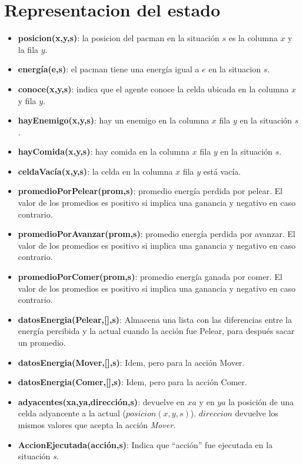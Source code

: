 \section{Representacion del estado}

\begin{itemize}

\item \textbf{posicion(x,y,s)}: la posicion del pacman en la situación $s$ es
la columna $x$ y la fila $y$.

\item \textbf{energía(e,s)}: el pacman tiene una energía igual a $e$ en la
situacion $s$.

\item \textbf{conoce(x,y,s)}: indica que el agente conoce la celda ubicada
en la columna $x$ y fila $y$.

\item \textbf{hayEnemigo(x,y,s)}: hay un enemigo en la columna $x$ fila $y$ en
la situación $s$.

\item \textbf{hayComida(x,y,s)}: hay comida en la columna $x$ fila $y$ en la
situación $s$.

\item \textbf{celdaVacía(x,y,s)}: la celda en la columna $x$ fila $y$ está
vacía.

\item \textbf{promedioPorPelear(prom,s)}: promedio energía perdida por pelear.
El valor de los promedios es positivo si implica una ganancia y negativo en
caso contrario.

\item \textbf{promedioPorAvanzar(prom,s)}: promedio energía perdida por
avanzar. El valor de los promedios es positivo si implica una ganancia y
negativo en caso contrario.

\item \textbf{promedioPorComer(prom,s)}: promedio energía ganada por comer. El
valor de los promedios es positivo si implica una ganancia y negativo en caso
contrario.

\item \textbf{datosEnergia(Pelear,[],s)}: Almacena una lista con las diferencias
entre la energía percibida y la actual cuando la acción fue Pelear, para después
sacar un promedio.

\item \textbf{datosEnergia(Mover,[],s)}: Idem, pero para la acción Mover.

\item \textbf{datosEnergia(Comer,[],s)}: Idem, pero para la acción Comer.

\item \textbf{adyacentes(xa,ya,dirección,s)}: devuelve en $xa$ y en $ya$ la
posición de una celda adyancente a la actual ($posicion(x,y,s)$). $direccion$
devuelve los mismos valores que acepta la acción \emph{Mover}.

\item \textbf{AccionEjecutada(acción,s)}: Indica que ``acción'' fue ejecutada
en la situación \emph{s}.

\end{itemize}
